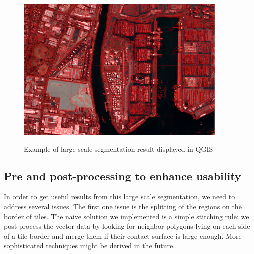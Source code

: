 \documentclass{josis}
\begin{document}
\begin{figure}[!htb]
\centering
\includegraphics[width=0.9\textwidth]{Pictures/ogrs_nostitch.png}\label{fig:nostitch}
\caption{Example of large scale segmentation result displayed in QGIS}
\end{figure}


\subsection{Pre and post-processing to enhance usability}

In order to get useful results from this large scale segmentation, we
need to address several issues. The first one issue is the splitting
of the regions on the border of tiles. The naive solution we
implemented is a simple stitching rule: we post-process the vector
data by looking for neighbor polygons lying on each side of a tile
border and merge them if their contact surface is large enough. More
sophisticated techniques might be derived in the future.
\end{document}
